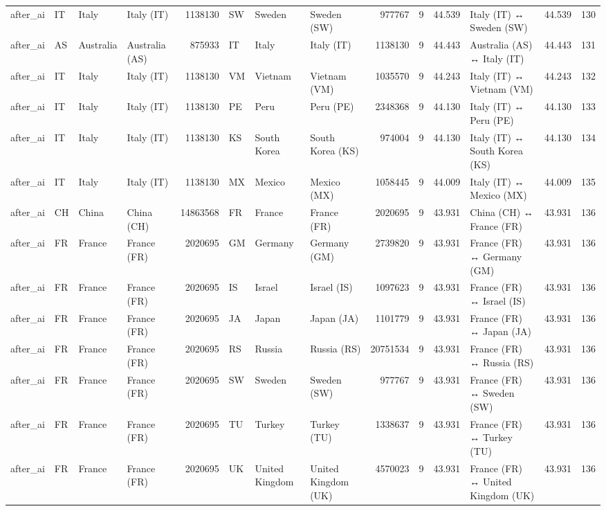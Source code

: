 \begin{tabular}{llllrlllrrrlrr}
after\_ai & IT & Italy & Italy (IT) & 1138130 & SW & Sweden & Sweden (SW) & 977767 & 9 & 44.539 & Italy (IT) ↔ Sweden (SW) & 44.539 & 130 \\
after\_ai & AS & Australia & Australia (AS) & 875933 & IT & Italy & Italy (IT) & 1138130 & 9 & 44.443 & Australia (AS) ↔ Italy (IT) & 44.443 & 131 \\
after\_ai & IT & Italy & Italy (IT) & 1138130 & VM & Vietnam & Vietnam (VM) & 1035570 & 9 & 44.243 & Italy (IT) ↔ Vietnam (VM) & 44.243 & 132 \\
after\_ai & IT & Italy & Italy (IT) & 1138130 & PE & Peru & Peru (PE) & 2348368 & 9 & 44.130 & Italy (IT) ↔ Peru (PE) & 44.130 & 133 \\
after\_ai & IT & Italy & Italy (IT) & 1138130 & KS & South Korea & South Korea (KS) & 974004 & 9 & 44.130 & Italy (IT) ↔ South Korea (KS) & 44.130 & 134 \\
after\_ai & IT & Italy & Italy (IT) & 1138130 & MX & Mexico & Mexico (MX) & 1058445 & 9 & 44.009 & Italy (IT) ↔ Mexico (MX) & 44.009 & 135 \\
after\_ai & CH & China & China (CH) & 14863568 & FR & France & France (FR) & 2020695 & 9 & 43.931 & China (CH) ↔ France (FR) & 43.931 & 136 \\
after\_ai & FR & France & France (FR) & 2020695 & GM & Germany & Germany (GM) & 2739820 & 9 & 43.931 & France (FR) ↔ Germany (GM) & 43.931 & 136 \\
after\_ai & FR & France & France (FR) & 2020695 & IS & Israel & Israel (IS) & 1097623 & 9 & 43.931 & France (FR) ↔ Israel (IS) & 43.931 & 136 \\
after\_ai & FR & France & France (FR) & 2020695 & JA & Japan & Japan (JA) & 1101779 & 9 & 43.931 & France (FR) ↔ Japan (JA) & 43.931 & 136 \\
after\_ai & FR & France & France (FR) & 2020695 & RS & Russia & Russia (RS) & 20751534 & 9 & 43.931 & France (FR) ↔ Russia (RS) & 43.931 & 136 \\
after\_ai & FR & France & France (FR) & 2020695 & SW & Sweden & Sweden (SW) & 977767 & 9 & 43.931 & France (FR) ↔ Sweden (SW) & 43.931 & 136 \\
after\_ai & FR & France & France (FR) & 2020695 & TU & Turkey & Turkey (TU) & 1338637 & 9 & 43.931 & France (FR) ↔ Turkey (TU) & 43.931 & 136 \\
after\_ai & FR & France & France (FR) & 2020695 & UK & United Kingdom & United Kingdom (UK) & 4570023 & 9 & 43.931 & France (FR) ↔ United Kingdom (UK) & 43.931 & 136 \\

\end{tabular}

